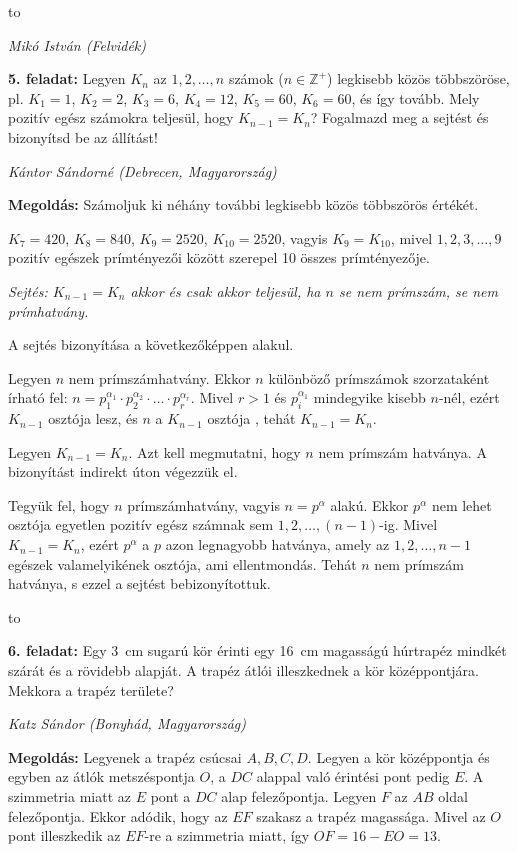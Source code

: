 \documentclass[a4paper,10pt]{article}
\newcommand{\ki}[2]{\hfill {\it #1 (#2)}\medskip}
\newcommand{\vonal}{\hbox to \hsize{\hskip2truecm\hrulefill\hskip2truecm}}
\begin{document}
\vonal

\ki{Mikó István}{Felvidék}\medskip

{\bf 5. feladat: }  Legyen $K_n$ az $1,2,\ldots,n$ számok ($n\in\mathbb{Z}^+$) legkisebb közös többszöröse, pl. $K_1=1$, $K_2=2$, $K_3=6$, $K_4=12$, $K_5=60$, $K_6=60$, és így tovább. Mely pozitív egész számokra teljesül, hogy $K_{n-1}=K_n$? Fogalmazd meg a sejtést és bizonyítsd be az állítást!			

\ki{Kántor Sándorné}{Debrecen, Magyarország}\medskip

{\bf Megoldás: } Számoljuk ki néhány további legkisebb közös többszörös értékét.

$K_7=420$, $K_8=840$, $K_9=2520$, $K_{10}=2520$, vagyis $K_9=K_{10}$, mivel $1,2,3,\ldots,9$ pozitív egészek prímtényezői között szerepel 10 összes prímtényezője.

\textit{Sejtés:  $K_{n-1}=K_n$ akkor és csak akkor teljesül, ha $n$ se nem prímszám, se nem prímhatvány.}

A sejtés bizonyítása a következőképpen alakul.

Legyen $n$ nem prímszámhatvány. Ekkor $n$ különböző prímszámok szorzataként írható fel: 
$n=p_1^{\alpha_1}\cdot p_2^{\alpha_2}\cdot\ldots\cdot p_r^{\alpha_r}$. Mivel $r>1$ és $p_i^{\alpha_1}$ mindegyike kisebb $n$-nél, ezért $K_{n-1}$ osztója lesz, és $n$ a $K_{n-1}$ osztója , tehát $K_{n-1}=K_n$.

Legyen $K_{n-1}=K_n$. Azt kell megmutatni, hogy $n$ nem prímszám hatványa. A bizonyítást indirekt úton végezzük el.

Tegyük fel, hogy $n$ prímszámhatvány, vagyis $n=p^\alpha$ alakú. Ekkor $p^\alpha$ nem lehet osztója egyetlen pozitív egész számnak sem $1, 2,\ldots,(n-1)$-ig. Mivel $K_{n-1}=K_n$, ezért $p^\alpha$ a $p$ azon legnagyobb hatványa, amely az  $1, 2,\ldots, n-1$ egészek valamelyikének osztója, ami ellentmondás. Tehát $n$ nem prímszám hatványa, s ezzel a sejtést bebizonyítottuk.

\vonal 


{\bf 6. feladat: } Egy 3~cm sugarú kör érinti egy 16~cm magasságú húrtrapéz mindkét szárát és a rövidebb alapját. A trapéz átlói illeszkednek a kör középpontjára. Mekkora a trapéz területe?

\ki{Katz Sándor}{Bonyhád, Magyarország}\medskip

{\bf Megoldás: } Legyenek a trapéz csúcsai $A, B, C, D$. Legyen a kör középpontja és egyben az átlók metszéspontja $O$, a $DC$ alappal való érintési pont pedig $E$. A szimmetria miatt az $E$ pont a $DC$ alap felezőpontja. Legyen $F$ az $AB$ oldal felezőpontja. Ekkor adódik, hogy az $EF$ szakasz a trapéz magassága. Mivel az $O$ pont illeszkedik az $EF$-re a szimmetria miatt, így $OF=16-EO=13$.
 
\end{document}
